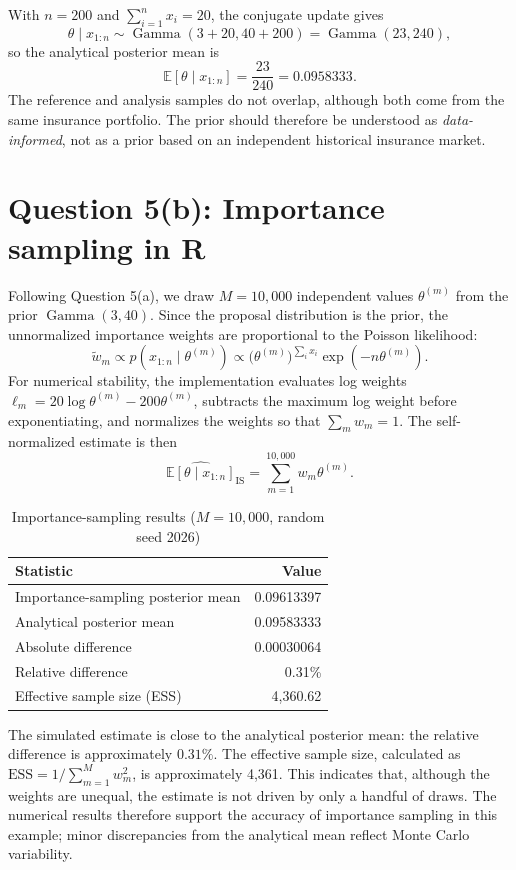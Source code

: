 \documentclass[11pt,a4paper]{article}
\begin{document}
With $n=200$ and $\sum_{i=1}^{n}x_i=20$, the conjugate update gives
\[
\theta\mid x_{1:n}\sim\operatorname{Gamma}(3+20,40+200)
=\operatorname{Gamma}(23,240),
\]
so the analytical posterior mean is
\[
\boxed{\mathbb{E}[\theta\mid x_{1:n}]=\frac{23}{240}
=0.0958333.}
\]
The reference and analysis samples do not overlap, although both come from the same insurance portfolio. The prior should therefore be understood as \emph{data-informed}, not as a prior based on an independent historical insurance market.

\section*{Question 5(b): Importance sampling in R}

Following Question 5(a), we draw $M=10{,}000$ independent values $\theta^{(m)}$ from the prior $\operatorname{Gamma}(3,40)$. Since the proposal distribution is the prior, the unnormalized importance weights are proportional to the Poisson likelihood:
\[
\widetilde w_m\propto p(x_{1:n}\mid\theta^{(m)})
\propto\bigl(\theta^{(m)}\bigr)^{\sum_i x_i}
\exp\!\left(-n\theta^{(m)}\right).
\]
For numerical stability, the implementation evaluates log weights $\ell_m=20\log\theta^{(m)}-200\theta^{(m)}$, subtracts the maximum log weight before exponentiating, and normalizes the weights so that $\sum_m w_m=1$. The self-normalized estimate is then
\[
\widehat{\mathbb{E}[\theta\mid x_{1:n}]}_{\mathrm{IS}}
=\sum_{m=1}^{10{,}000}w_m\theta^{(m)}.
\]

\begin{table}[ht]
\centering
\caption{Importance-sampling results ($M=10{,}000$, random seed 2026)}
\begin{tabular}{lr}
\toprule
Statistic & Value \\
\midrule
Importance-sampling posterior mean & 0.09613397 \\
Analytical posterior mean & 0.09583333 \\
Absolute difference & 0.00030064 \\
Relative difference & 0.31\% \\
Effective sample size (ESS) & 4,360.62 \\
\bottomrule
\end{tabular}
\end{table}

The simulated estimate is close to the analytical posterior mean: the relative difference is approximately $0.31\%$. The effective sample size, calculated as $\mathrm{ESS}=1/\sum_{m=1}^{M}w_m^2$, is approximately 4,361. This indicates that, although the weights are unequal, the estimate is not driven by only a handful of draws. The numerical results therefore support the accuracy of importance sampling in this example; minor discrepancies from the analytical mean reflect Monte Carlo variability.
\end{document}
